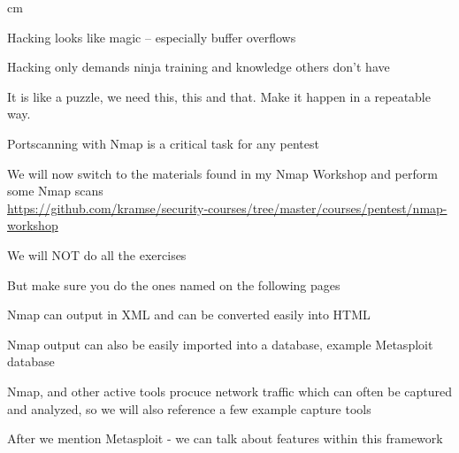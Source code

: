\documentclass[Screen16to9,17pt]{foils}
\begin{document}


 cm

\centerline{Hacking looks like magic -- especially buffer overflows}




\centerline{Hacking only demands ninja training and knowledge others don't have}

It is like a puzzle, we need this, this and that. Make it happen in a repeatable way.




\begin{list2}
\item Portscanning with Nmap is a critical task for any pentest
\item We will now switch to the materials found in my Nmap Workshop and perform some Nmap scans\\
\url{https://github.com/kramse/security-courses/tree/master/courses/pentest/nmap-workshop}
\item We will NOT do all the exercises
\item But make sure you do the ones named on the following pages
\item Nmap can output in XML and can be converted easily into HTML
\item Nmap output can also be easily imported into a database, example Metasploit database
\item Nmap, and other active tools procuce network traffic which can often be captured and analyzed, so we will also reference a few example capture tools
\end{list2}

After we mention Metasploit - we can talk about features within this framework \smiley










\end{document}
